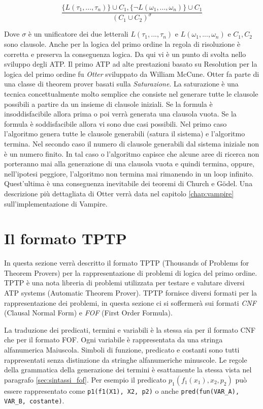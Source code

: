\documentclass[./main.tex]{subfiles}
\begin{document}
$$ \frac{\{L(\tau_1, ..., \tau_n)\} \cup C_1, \{\lnot L(\omega_1, ..., \omega_n)\} \cup C_1}{(C_1 \cup C_2)^\sigma} $$

Dove $\sigma$ è un unificatore dei due letterali $L(\tau_1, ..., \tau_n)$ e $L(\omega_1, ..., \omega_n)$ e $C_1, C_2$ sono clausole.
Anche per la logica del primo ordine la regola di risoluzione è corretta e preserva la conseguenza logica.
Da qui vi è un punto di svolta nello sviluppo degli ATP.
Il primo ATP ad alte prestazioni basato su Resolution per la logica del primo ordine fu \textit{Otter} sviluppato da William McCune.
Otter fa parte di una classe di theorem prover basati sulla \textit{Saturazione}.
La saturazione è una tecnica concettualmente molto semplice che consiste nel generare 
tutte le clausole possibili a partire da un insieme di clausole iniziali.
Se la formula è insoddisfacibile allora prima o poi verrà generata una clausola vuota.
Se la formula è soddisfacibile allora vi sono due casi possibili.
Nel primo caso l'algoritmo genera tutte le clausole generabili (satura il sistema) e l'algoritmo termina.
Nel secondo caso il numero di clausole generabili dal sistema iniziale non è un numero finito.
In tal caso o l'algoritmo capisce che alcune aree di ricerca non porteranno mai alla generazione 
di una clausola vuota e quindi termina,
oppure, nell'ipotesi peggiore, l'algoritmo non termina mai rimanendo in un loop infinito.
Quest'ultima è una conseguenza inevitabile dei teoremi di Church e Gödel.
Una descrizione più dettagliata di Otter verrà data nel capitolo \ref{chap:vampire} sull'implementazione di Vampire.




\section{Il formato TPTP} \label{sec:tptp_lang}
In questa sezione verrà descritto il formato TPTP \cite{tptpLan} (Thousands of Problems for Theorem Provers) 
per la rappresentazione di problemi di logica del primo ordine.
TPTP è una nota libreria di problemi utilizzata per testare e valutare diversi ATP systems (Automatic Theorem Prover).
TPTP fornisce diversi formati per la rappresentazione dei problemi,
in questa sezione ci si soffermerà sui formati \textit{CNF} (Clausal Normal Form) e \textit{FOF} (First Order Formula).


La traduzione dei predicati, termini e variabili è la stessa sia per il formato CNF che per il formato FOF.
Ogni variabile è rappresentata da una stringa alfanumerica Maiuscola. 
Simboli di funzione, predicato e costanti sono tutti rappresentati senza distinzione da stringhe alfanumeriche minuscole.
Le regole della grammatica della generazione dei termini è esattamente la stessa vista nel paragrafo \ref{sec:sintassi_fof}.
Per esempio il predicato $p_1(f_1(x_1), x_2, p_2)$ 
può essere rappresentato come \texttt{p1(f1(X1), X2, p2)} o anche \texttt{pred(fun(VAR\_A), VAR\_B, costante)}.
\end{document}

